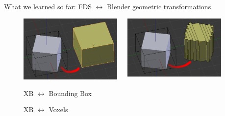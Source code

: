 \documentclass[aspectratio=169]{beamer}
\begin{document}
\begin{frame}[fragile]{What we learned so far: \linebreak FDS $\leftrightarrow$ Blender geometric transformations}
    \begin{figure}[H]
        \centering
        \begin{columns}[T]
            \begin{column}{.3\linewidth}
                \includegraphics[width=\linewidth]{images/T_BBOX.png}
                \caption{XB $\leftrightarrow$ Bounding Box}
            \end{column}
            \begin{column}{.3\linewidth}
                \includegraphics[width=\linewidth]{images/T_VOXELS.png}
                \caption{XB $\leftrightarrow$ Voxels}
            \end{column}
            \begin{column}{.3\linewidth}

\end{column}
\end{columns}
\end{figure}
\end{frame}
\end{document}
